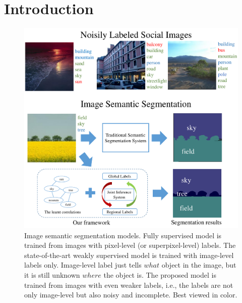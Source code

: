 \section{Introduction}

\begin{figure}[t]
\begin{center}
    \includegraphics[width=1\linewidth]{fig_noisyparsing.pdf}
\end{center}
    \caption{Image semantic segmentation models. Fully  supervised model is trained from images with pixel-level (or  superpixel-level) labels. The state-of-the-art weakly supervised model is trained with image-level labels only. Image-level label just tells $what$ object in the image, but it is still unknown $where$ the object is. The proposed model is trained from images with even weaker labels, i.e., the labels are not only image-level but also noisy and incomplete.       Best viewed in color.}
\label{fig:noisyparsing}
\end{figure}


